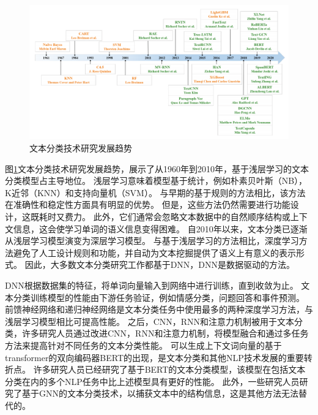 \begin{figure}[htbp]
  \centering
  \includegraphics[width=16cm]{./images/text.png}
  \caption{文本分类技术研究发展趋势\cite{li2020survey}}
  \label{fig:textClassification}
\end{figure}

图\ref{fig:textClassification}文本分类技术研究发展趋势，展示了从1960年到2010年，基于浅层学习的文本分类模型占主导地位。
浅层学习意味着模型基于统计，例如朴素贝叶斯（NB），K近邻（KNN）和支持向量机（SVM）。
与早期的基于规则的方法相比，该方法在准确性和稳定性方面具有明显的优势。
但是，这些方法仍然需要进行功能设计，这既耗时又费力。
此外，它们通常会忽略文本数据中的自然顺序结构或上下文信息，这会使学习单词的语义信息变得困难。
自2010年以来，文本分类已逐渐从浅层学习模型演变为深层学习模型。
与基于浅层学习的方法相比，深度学习方法避免了人工设计规则和功能，并自动为文本挖掘提供了语义上有意义的表示形式。
因此，大多数文本分类研究工作都基于DNN，DNN是数据驱动的方法。

DNN根据数据集的特征，将单词向量输入到网络中进行训练，直到收敛为止。
文本分类训练模型的性能由下游任务验证，例如情感分类，问题回答和事件预测。
前馈神经网络和递归神经网络是文本分类任务中使用最多的两种深度学习方法，与浅层学习模型相比可提高性能。
之后，CNN，RNN和注意力机制被用于文本分类，许多研究人员通过改进CNN，RNN和注意力机制，将模型融合和通过多任务方法来提高针对不同任务的文本分类性能。
可以生成上下文词向量的基于transformer的双向编码器BERT\cite{devlin2018bert}的出现，是文本分类和其他NLP技术发展的重要转折点。
许多研究人员已经研究了基于BERT的文本分类模型，该模型在包括文本分类在内的多个NLP任务中比上述模型具有更好的性能。
此外，一些研究人员研究了基于GNN的文本分类技术，以捕获文本中的结构信息，这是其他方法无法替代的。

